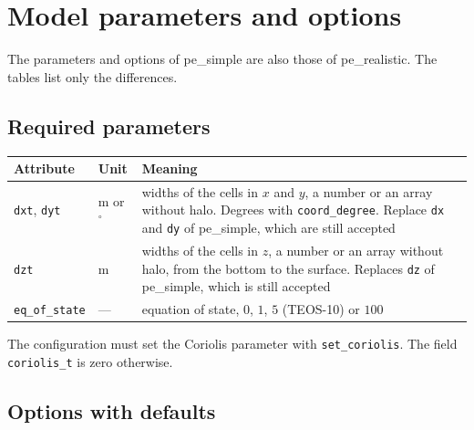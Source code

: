 \documentclass[12pt]{article}
\begin{document}
\section*{Model parameters and options}

The parameters and options of pe\_simple are also those of pe\_realistic.
The tables list only the differences.

\subsection*{Required parameters}

\begin{longtable}{@{}llp{8.4cm}@{}}
\hline
Attribute & Unit & Meaning \\
\hline
\endhead
\verb|dxt|, \verb|dyt| & m or $^\circ$ & widths of the cells in $x$ and $y$, a number or an array without halo.
  Degrees with \verb|coord_degree|. Replace \verb|dx| and \verb|dy| of pe\_simple, which are still accepted \\
\verb|dzt| & m & widths of the cells in $z$, a number or an array without halo, from the bottom to the surface.
  Replaces \verb|dz| of pe\_simple, which is still accepted \\
\verb|eq_of_state| & --- & equation of state, $0$, $1$, $5$ (TEOS-10) or $100$ \\
\hline
\end{longtable}

\noindent
The configuration must set the Coriolis parameter with \verb|set_coriolis|.
The field \verb|coriolis_t| is zero otherwise.

\subsection*{Options with defaults}
\end{document}
